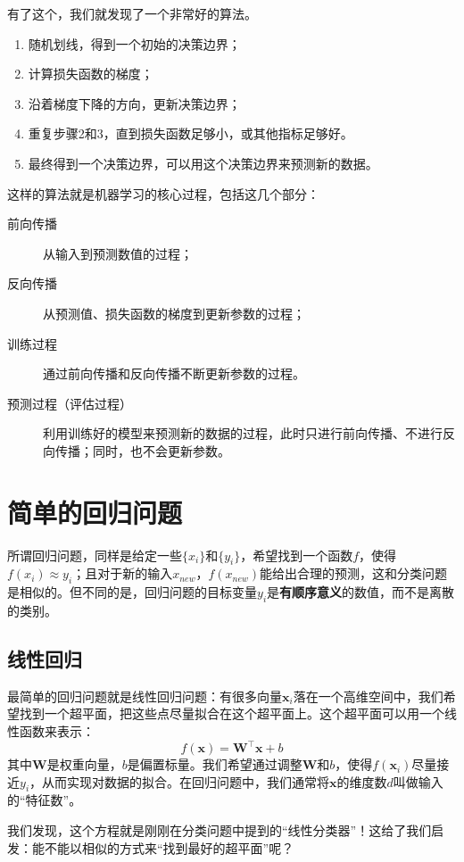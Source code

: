 有了这个，我们就发现了一个非常好的算法。
\begin{enumerate}
    \item 随机划线，得到一个初始的决策边界；
    \item 计算损失函数的梯度；
    \item 沿着梯度下降的方向，更新决策边界；
    \item 重复步骤2和3，直到损失函数足够小，或其他指标足够好。
    \item 最终得到一个决策边界，可以用这个决策边界来预测新的数据。
\end{enumerate}
这样的算法就是机器学习的核心过程，包括这几个部分：
\begin{description}
    \item[前向传播] 从输入到预测数值的过程；
    \item[反向传播] 从预测值、损失函数的梯度到更新参数的过程；
    \item[训练过程] 通过前向传播和反向传播不断更新参数的过程。
    \item[预测过程（评估过程）] 利用训练好的模型来预测新的数据的过程，此时只进行前向传播、不进行反向传播；同时，也不会更新参数。
\end{description}

\section{简单的回归问题}

所谓回归问题，同样是给定一些$\{x_i\}$和$\{y_i\}$，希望找到一个函数$f$，使得$f(x_i) \approx y_i$；且对于新的输入$x_{new}$，$f(x_{new})$能给出合理的预测，这和分类问题是相似的。但不同的是，回归问题的目标变量$y_i$是\textbf{有顺序意义}的数值，而不是离散的类别。

\subsection{线性回归}

最简单的回归问题就是线性回归问题：有很多向量$\mathbf{x}_i$落在一个高维空间中，我们希望找到一个超平面，把这些点尽量拟合在这个超平面上。这个超平面可以用一个线性函数来表示：
\[ f(\mathbf{x}) = \mathbf{W}^\top \mathbf{x} + b \]
其中$\mathbf{W}$是权重向量，$b$是偏置标量。我们希望通过调整$\mathbf{W}$和$b$，使得$f(\mathbf{x}_i)$尽量接近$y_i$，从而实现对数据的拟合。在回归问题中，我们通常将$\mathbf{x}$的维度数$d$叫做输入的“特征数”。

我们发现，这个方程就是刚刚在分类问题中提到的“线性分类器”！这给了我们启发：能不能以相似的方式来“找到最好的超平面”呢？

